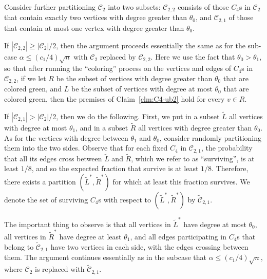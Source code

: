 \documentclass{article}
\newcommand{\calC}{{\mathcal{C}}}
\begin{document}
Consider further partitioning $\calC_2$ into two subsets: $\calC_{2,2}$ consists of those $C_4$s in $\calC_2$ that contain exactly two vertices with degree greater than $\theta_0$, and $\calC_{2,1}$ of those that contain at most one vertex with degree greater than $\theta_0$. 

If $|\calC_{2,2}| \geq |\calC_2|/2$, then 
the argument  proceeds essentially the same as for the sub-case  $\alpha \leq (c_1/4)\sqrt  n$ with $\calC_2$ replaced by $\calC_{2,2}$. Here we use the fact that $\theta_0 > \theta_1$, so that after running the ``coloring'' process on the vertices and edges of $C_4$s in $\calC_{2,2}$, if we let $R$ be the subset of vertices with degree greater than $\theta_0$ that are colored green, and $L$ be the subset of vertices with degree at most $\theta_0$ that are colored green, then the premises of Claim~\ref{clm:C4-ub2} hold for every $v\in R$.

 If $|\calC_{2,1}|>|\calC_2|$/2, then
we do the following. First, we put in 
a  subset $\widetilde{L}$ all vertices with degree at most $\theta_1$, and in a subset $\widetilde{R}$ all vertices with degree greater than $\theta_0$. As for the vertices with degree between $\theta_1$ and $\theta_0$, consider  randomly partitioning  them into the two sides. Observe that for each fixed $C_4$ in $\calC_{2,1}$, the probability that all its edges cross between $\widetilde{L}$ and $\widetilde{R}$, which we refer to as ``surviving'', is at least $1/8$, and so the expected fraction that survive is at least $1/8$. Therefore, there exists a partition 
$(\widetilde{L}^*,\widetilde{R}^*)$ 
for which at least this fraction survives. We denote the set of surviving $C_4$s with respect to $(\widetilde{L}^*,\widetilde{R}^*)$ by $\widetilde{\calC}_{2,1}$. 

The important thing to observe is that all vertices in $\widetilde{L}^*$ have degree at most $\theta_0$, all vertices in $\widetilde{R}^*$ have degree at least $\theta_1$, and all edges participating in $C_4$s that belong to $\widetilde{\calC}_{2,1}$ have two vertices in each side, with the edges crossing between them.
The argument continues essentially as in the subcase that $\alpha \leq (c_1/4)\sqrt{n}$, where $\calC_2$ is replaced with $\widetilde{\calC}_{2,1}$.
\end{document}
